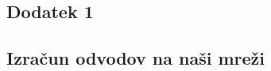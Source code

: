 \documentclass[longbibliography,slovene,a4paper,12pt]{book}
\begin{document}

\cleardoublepage
\renewcommand\appendixname{Dodatek}
\begin{appendices}

\chapter{Dodatek 1}
\section{Izračun odvodov na naši mreži}
    
    

\end{appendices}


\cleardoublepage
\printindex
\end{document}
